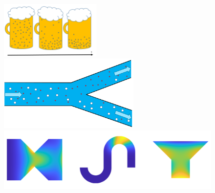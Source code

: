 \documentclass[aspectratio=169,xcolor=dvipsnames]{beamer}
\begin{document}
\begin{frame}

		\begin{figure}
			\includegraphics[width=5cm]{beer.png}
			\includegraphics[width=7cm]{Microfilter.png}
			\includegraphics[width=12cm]{Future.png}
		\end{figure}
		
\end{frame}
\end{document}

